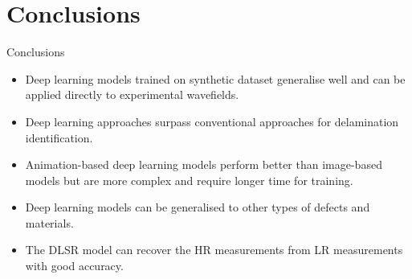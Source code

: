 \documentclass[10pt,aspectratio=169,dvipsnames]{beamer} %
\begin{document}
	\section{Conclusions}
	\begin{frame}{Conclusions}		
			\begin{justify}
				\addtolength{\leftmargini}{\labelsep}
				\begin{itemize}
					\item{Deep learning models trained on synthetic dataset generalise well and can be applied directly to experimental wavefields.}			
					\item{Deep learning approaches surpass conventional approaches for delamination identification.}	
					\item{Animation-based deep learning models perform better than image-based models but are more complex and require longer time for training.}					
					\item{Deep learning models can be generalised to other types of defects and materials.}
					\item{The DLSR model can recover the HR measurements from LR measurements with good accuracy.}
				\end{itemize}
			\end{justify}				
	\end{frame}			
	\note{}	
\end{document}
